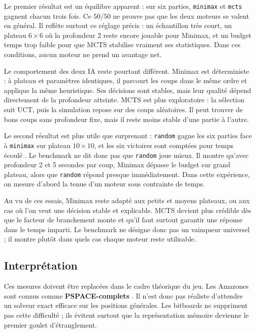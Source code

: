 \documentclass[a4paper]{article}
\begin{document}
Le premier résultat est un équilibre apparent : sur six parties, \texttt{minimax} et \texttt{mcts} gagnent chacun trois fois. Ce $50/50$ ne prouve pas que les deux moteurs se valent en général. Il reflète surtout ce réglage précis : un échantillon très court, un plateau $6 \times 6$ où la profondeur 2 reste encore jouable pour Minimax, et un budget temps trop faible pour que MCTS stabilise vraiment ses statistiques. Dans ces conditions, aucun moteur ne prend un avantage net.

Le comportement des deux IA reste pourtant différent. Minimax est déterministe : à plateau et paramètres identiques, il parcourt les coups dans le même ordre et applique la même heuristique. Ses décisions sont stables, mais leur qualité dépend directement de la profondeur atteinte. MCTS est plus exploratoire : la sélection suit UCT, puis la simulation repose sur des coups aléatoires. Il peut trouver de bons coups sans profondeur fixe, mais il reste moins stable d'une partie à l'autre.

Le second résultat est plus utile que surprenant : \texttt{random} gagne les six parties face à \texttt{minimax} sur plateau $10 \times 10$, et les six victoires sont comptées pour \og temps écoulé \fg{}. Le benchmark ne dit donc pas que \texttt{random} joue mieux. Il montre qu'avec profondeur 2 et 5 secondes par coup, Minimax dépasse le budget sur grand plateau, alors que \texttt{random} répond presque immédiatement. Dans cette expérience, on mesure d'abord la tenue d'un moteur sous contrainte de temps.

Au vu de ces essais, Minimax reste adapté aux petits et moyens plateaux, ou aux cas où l'on veut une décision stable et explicable. MCTS devient plus crédible dès que le facteur de branchement monte et qu'il faut surtout garantir une réponse dans le temps imparti. Le benchmark ne désigne donc pas un vainqueur universel ; il montre plutôt dans quels cas chaque moteur reste utilisable.

\subsection{Interprétation}

Ces mesures doivent être replacées dans le cadre théorique du jeu. Les Amazones sont connus comme \textbf{PSPACE-complets} \cite{hearn2005}. Il n'est donc pas réaliste d'attendre un solveur exact efficace sur les positions générales. Les bitboards ne suppriment pas cette difficulté ; ils évitent surtout que la représentation mémoire devienne le premier goulet d'étranglement.
\end{document}
